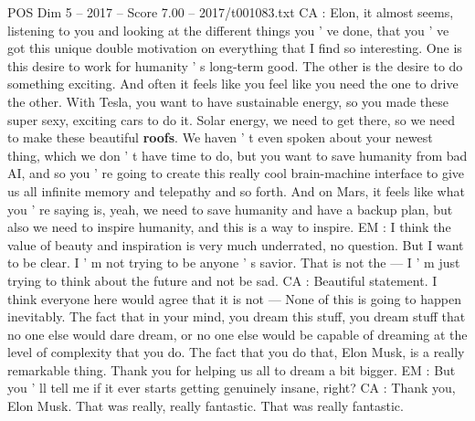 \begin{textsample}{POS Dim 5 – 2017 – Score 7.00 – 2017/t001083.txt}
CA : Elon, it almost seems, listening to you and looking at the different things you ' ve done, that you ' ve got this unique double motivation on everything that I find so interesting.
One is this desire to work for humanity ' s long-term good.
The other is the desire to do something exciting.
And often it feels like you feel like you need the one to drive the other.
With Tesla, you want to have sustainable energy, so you made these super sexy, exciting cars to do it.
Solar energy, we need to get there, so we need to make these beautiful \textbf{roofs}.
We haven ' t even spoken about your newest thing, which we don ' t have time to do, but you want to save humanity from bad AI, and so you ' re going to create this really cool brain-machine interface to give us all infinite memory and telepathy and so forth.
And on Mars, it feels like what you ' re saying is, yeah, we need to save humanity and have a backup plan, but also we need to inspire humanity, and this is a way to inspire.
EM : I think the value of beauty and inspiration is very much underrated, no question.
But I want to be clear.
I ' m not trying to be anyone ' s savior.
That is not the — I ' m just trying to think about the future and not be sad.
CA : Beautiful statement.
I think everyone here would agree that it is not — None of this is going to happen inevitably.
The fact that in your mind, you dream this stuff, you dream stuff that no one else would dare dream, or no one else would be capable of dreaming at the level of complexity that you do.
The fact that you do that, Elon Musk, is a really remarkable thing.
Thank you for helping us all to dream a bit bigger.
EM : But you ' ll tell me if it ever starts getting genuinely insane, right?
CA : Thank you, Elon Musk.
That was really, really fantastic.
That was really fantastic.

\end{textsample}
